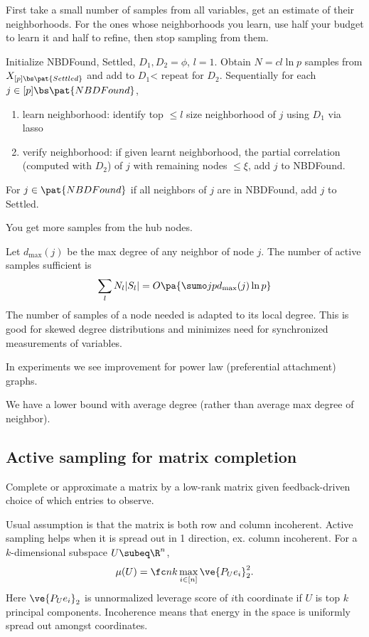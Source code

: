 First take a small number of samples from all variables, get an estimate of their neighborhoods. For the ones whose neighborhoods you learn, use half your budget to learn it and half to refine, then stop sampling from them.

Initialize NBDFound, Settled, $D_1,D_2=\phi$, $l=1$.
Obtain $N=cl\ln p$ samples from $X_{[p]\bs\pat{Settled}}$ and add to $D_1$< repeat for $D_2$. Sequentially for each $j\in [p]\bs\pat{NBDFound}$, 
\begin{enumerate}
\item
learn neighborhood: identify top $\le l$ size neighborhood of $j$ using $D_1$ via lasso
\item
verify neighborhood: if given learnt neighborhood, the partial correlation (computed with $D_2$) of $j$ with remaining nodes $\le \xi$, add $j$ to NBDFound.
\end{enumerate}
For $j\in \pat{NBDFound}$ if all neighbors of $j$ are in NBDFound, add $j$ to Settled.

You get more samples from the hub nodes. 

Let $d_{\max}(j)$ be the max degree of any neighbor of node $j$. 
The number of active samples sufficient is %
$$
\sum_l N_l|S_l| = O\pa{\sumo jp d_{\max}(j)\ln p}
$$
The number of samples of a node needed is adapted to its local degree. This is good for skewed degree distributions and minimizes need for synchronized measurements of variables.

In experiments we see improvement for power law (preferential attachment) graphs.

We have a lower bound with average degree (rather than average max degree of neighbor).

\subsection{Active sampling for matrix completion}

Complete or approximate a matrix by a low-rank matrix given feedback-driven choice of which entries to observe.

Usual assumption is that the matrix is both row and column incoherent. Active sampling helps when it is spread out in 1 direction, ex. column incoherent. 
For a $k$-dimensional subspace $U\subeq \R^n$, 
$$
\mu(U) = \fc nk \max_{i\in [n]} \ve{P_Ue_i}_2^2.
$$
Here $\ve{P_Ue_i}_2$ is unnormalized leverage score of $i$th coordinate if $U$ is top $k$ principal components.
Incoherence means that energy in the space is uniformly spread out amongst coordinates.

